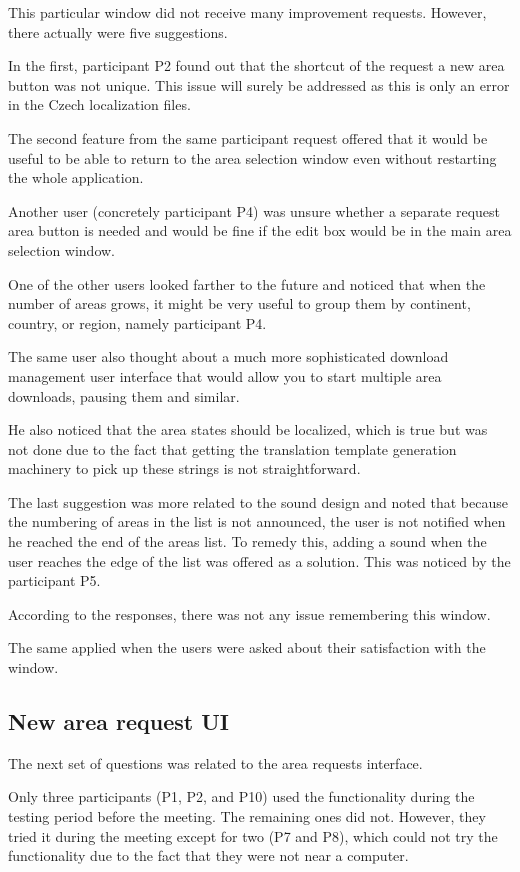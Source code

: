 \documentclass[nolof,digital]{fithesis3}
\begin{document}
This particular window did not receive many improvement requests. However, there actually were five suggestions.

In the first, participant P2 found out that the shortcut of the request a new area button was not unique. This issue will surely be addressed as this is only an error in the Czech localization files.

The second feature from the same participant request offered that it would be useful to be able to return to the area selection window even without restarting the whole application.

Another user (concretely participant P4) was unsure whether a separate request area button is needed and would be fine if the edit box would be in the main area selection window.

One of the other users looked farther to the future and noticed that when the number of areas grows, it might be very useful to group them by continent, country, or region, namely participant P4.

The same user also thought about a much more sophisticated download management user interface that would allow you to start multiple area downloads, pausing them and similar.

He also noticed that the area states should be localized, which is true but was not done due to the fact that getting the translation template generation machinery to pick up these strings is not straightforward.

The last suggestion was more related to the sound design and noted that because the numbering of areas in the list is not announced, the user is not notified when he reached the end of the areas list. To remedy this, adding a sound when the user reaches the edge of the list was offered as a solution. This was noticed by the participant P5.

According to the responses, there was not any issue remembering this window.

The same applied when the users were asked about their satisfaction with the window.
\subsection{New area request UI}
The next set of questions was related to the area requests interface.

Only three participants (P1, P2, and P10) used the functionality during the testing period before the meeting. The remaining ones did not. However, they tried it during the meeting except for two (P7 and P8), which could not try the functionality due to the fact that they were not near a computer.
\end{document}
